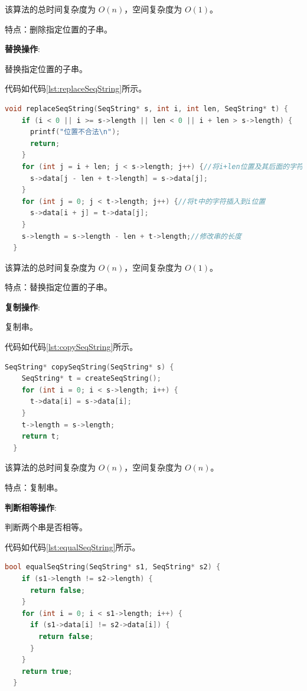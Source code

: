 \documentclass[lang=cn,newtx,10pt,scheme=chinese]{elegantbook}
\begin{document}
该算法的总时间复杂度为 $O(n)$，空间复杂度为 $O(1)$。

特点：删除指定位置的子串。

\textbf{替换操作}:

替换指定位置的子串。

代码如代码\ref{lst:replaceSeqString}所示。

\begin{lstlisting}[language=C++, caption={替换指定位置的子串示例代码}, label={lst:replaceSeqString}]
  void replaceSeqString(SeqString* s, int i, int len, SeqString* t) {
    if (i < 0 || i >= s->length || len < 0 || i + len > s->length) {
      printf("位置不合法\n");
      return;
    }
    for (int j = i + len; j < s->length; j++) {//将i+len位置及其后面的字符前移
      s->data[j - len + t->length] = s->data[j];
    }
    for (int j = 0; j < t->length; j++) {//将t中的字符插入到i位置
      s->data[i + j] = t->data[j];
    }
    s->length = s->length - len + t->length;//修改串的长度
  }

\end{lstlisting}

该算法的总时间复杂度为 $O(n)$，空间复杂度为 $O(1)$。

特点：替换指定位置的子串。

\textbf{复制操作}:

复制串。

代码如代码\ref{lst:copySeqString}所示。

\begin{lstlisting}[language=C++, caption={复制串示例代码}, label={lst:copySeqString}]
  SeqString* copySeqString(SeqString* s) {
    SeqString* t = createSeqString();
    for (int i = 0; i < s->length; i++) {
      t->data[i] = s->data[i];
    }
    t->length = s->length;
    return t;
  }

\end{lstlisting}

该算法的总时间复杂度为 $O(n)$，空间复杂度为 $O(n)$。

特点：复制串。

\textbf{判断相等操作}:

判断两个串是否相等。

代码如代码\ref{lst:equalSeqString}所示。

\begin{lstlisting}[language=C++, caption={判断两个串是否相等示例代码}, label={lst:equalSeqString}]
  bool equalSeqString(SeqString* s1, SeqString* s2) {
    if (s1->length != s2->length) {
      return false;
    }
    for (int i = 0; i < s1->length; i++) {
      if (s1->data[i] != s2->data[i]) {
        return false;
      }
    }
    return true;
  }

\end{lstlisting}
\end{document}
